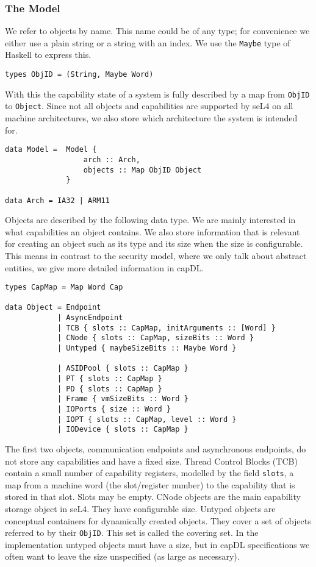 \documentclass[a4paper,11pt]{article}
\begin{document}
\subsubsection{The Model}
We refer to objects by name. This name could be of any type; for convenience we either use a plain string or a string with an index. We use the \texttt{Maybe} type of Haskell to express this. 

\begin{verbatim}
types ObjID = (String, Maybe Word)
\end{verbatim}

With this the capability state of a system is fully described by a map from \texttt{ObjID} to \texttt{Object}. Since not all objects and capabilities are supported by seL4 on all machine architectures, we also store which architecture the system is intended for.

\begin{verbatim}
data Model =  Model {
                  arch :: Arch,
                  objects :: Map ObjID Object
              } 

data Arch = IA32 | ARM11
\end{verbatim}

Objects are described by the following data type. We are mainly interested in what capabilities an object contains. We also store information that is relevant for creating an object such as its type and its size when the size is configurable. This means in contrast to the security model, where we only talk about abstract entities, we give more detailed information in capDL.

\begin{verbatim}
types CapMap = Map Word Cap

data Object = Endpoint
            | AsyncEndpoint
            | TCB { slots :: CapMap, initArguments :: [Word] }
            | CNode { slots :: CapMap, sizeBits :: Word } 
            | Untyped { maybeSizeBits :: Maybe Word }

            | ASIDPool { slots :: CapMap }
            | PT { slots :: CapMap }
            | PD { slots :: CapMap }
            | Frame { vmSizeBits :: Word }
            | IOPorts { size :: Word }
            | IOPT { slots :: CapMap, level :: Word }
            | IODevice { slots :: CapMap }
\end{verbatim}

The first two objects, communication endpoints and asynchronous endpoints, do not store any capabilities and have a fixed size. Thread Control Blocks (TCB) contain a small number of capability registers, modelled by the field \texttt{slots}, a map from a machine word (the slot/register number) to the capability that is stored in that slot. Slots may be empty. CNode objects are the main capability storage object in seL4. They have configurable size. Untyped objects are conceptual containers for dynamically created objects. They cover a set of objects referred to by their \texttt{ObjID}. This set is called the covering set. In the implementation untyped objects must have a size, but in capDL specifications we often want to leave the size unspecified (as large as necessary). 
\end{document}
